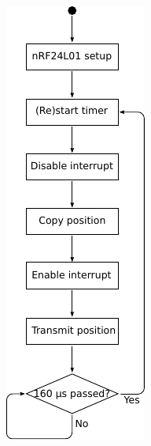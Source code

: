 \begin{figure}[h]
	\centering
	\begin{subfigure}[b]{0.30\textwidth}
		\centering
		\includegraphics[width=.8\linewidth]{graphics/joint_software_diagram}

\end{subfigure}
\end{figure}

